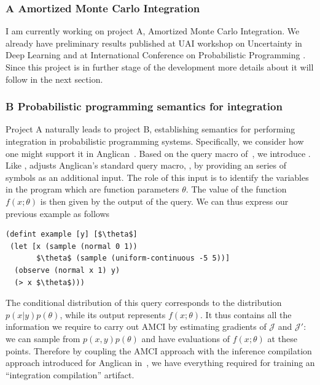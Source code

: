 \documentclass[12pt]{article}
\begin{document}
\subsubsection*{A \quad Amortized Monte Carlo Integration}
I am currently working on project A, Amortized Monte Carlo Integration. 
We already have preliminary results published at UAI workshop on Uncertainty in Deep Learning \citep{golinski2018uai} and at International Conference on Probabilistic Programming \citep{golinski2018probprog}. 
Since this project is in further stage of the development more details about it will follow in the next section.
 

\subsubsection*{B \quad Probabilistic programming semantics for integration}
Project A naturally leads to project B, establishing semantics for performing integration in probabilistic programming systems.
Specifically, we consider 
how one might support it in Anglican~\cite{tolpin2016design}.
Based on the query macro  of~\cite{rainforth2016bopp}, 
we introduce .  Like ,  adjusts Anglican's
standard query macro, , by providing an series of symbols as an additional input.
The role of this input is to identify the variables in the program which
are function parameters $\theta$.  The value of the 
function $f(x;\theta)$ is then given by the output of the query.
We can thus express our previous
example as follows
\vspace{-4pt}
\begin{lstlisting}[basicstyle=\ttfamily\small,frame=none]
(defint example [y] [$\theta$]
 (let [x (sample (normal 0 1))
       $\theta$ (sample (uniform-continuous -5 5))]
  (observe (normal x 1) y)
  (> x $\theta$)))
\end{lstlisting}
\vspace{-4pt}
The conditional distribution of this query corresponds to the distribution
$p(x|y)p(\theta)$, while its output represents $f(x;\theta)$.  It thus
contains all the information we require to carry out AMCI by estimating
gradients of $\mathcal{J}$ and $\mathcal{J}'$:
we can sample from $p(x,y)p(\theta)$ and have evaluations of
$f(x;\theta)$ at these points.  Therefore by coupling the AMCI approach
with the inference compilation approach introduced for Anglican
in~\cite{LeEtAl2016}, we have everything required for
training an ``integration compilation'' artifact.
\end{document}
